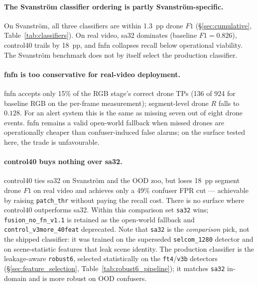 \paragraph{The Svanstr\"om classifier ordering is partly Svanstr\"om-specific.}
On Svanstr\"om, all three classifiers are within 1.3~pp drone $F1$ (\S\ref{sec:cumulative}, Table~\ref{tab:classifiers}). On real video, sa32 dominates (baseline $F1=0.826$), control40 trails by 18~pp, and fnfn collapses recall below operational viability. The Svanstr\"om benchmark does not by itself select the production classifier.

\paragraph{fnfn is too conservative for real-video deployment.}
fnfn accepts only 15\% of the RGB stage's correct drone TPs (136 of 924 for baseline RGB on the per-frame measurement); segment-level drone $R$ falls to $0.128$. For an alert system this is the same as missing seven out of eight drone events. fnfn remains a valid open-world fallback when missed drones are operationally cheaper than confuser-induced false alarms; on the surface tested here, the trade is unfavourable.

\paragraph{control40 buys nothing over sa32.}
control40 ties sa32 on Svanstr\"om and the OOD zoo, but loses 18~pp segment drone $F1$ on real video and achieves only a 49\% confuser FPR cut --- achievable by raising \texttt{patch\_thr} without paying the recall cost. There is no surface where control40 outperforms sa32. Within this comparison set \texttt{sa32} wins; \texttt{fusion\_no\_fn\_v1.1} is retained as the open-world fallback and \texttt{control\_v3more\_40feat} deprecated. Note that \texttt{sa32} is the \emph{comparison} pick, not the shipped classifier: it was trained on the superseded \texttt{selcom\_1280} detector and on scene-statistic features that leak scene identity. The production classifier is the leakage-aware \texttt{robust6}, selected statistically on the \texttt{ft4}/\texttt{v3b} detectors (\S\ref{sec:feature_selection}, Table~\ref{tab:robust6_pipeline}); it matches \texttt{sa32} in-domain and is more robust on OOD confusers.


